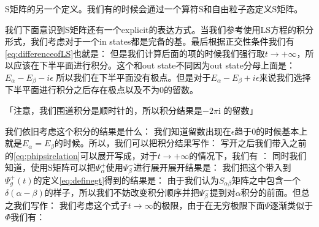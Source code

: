  S矩阵的另一个定义。我们有的时候会通过一个算符S和自由粒子态定义S矩阵。

我们下面意识到S矩阵还有一个explicit的表达方式。当我们参考使用LS方程的积分形式，我们考虑对于一个in states都是完备的基。最后根据正交性条件我们有\cref{eq:differenceofLS}也就是：
但是我们计算后面的项的时候我们强行取$ t \to +\infty $，所以应该在下半平面进行积分。这个和out state不同因为out state分母上面是：$ E_\alpha-E_\beta- i\epsilon $ 所以我们在下半平面没有极点。但是对于$ E_\alpha-E_\beta+ i\epsilon $来说我们选择下半平面进行积分之后存在极点以及不为0的留数。

「注意，我们围道积分是顺时针的，所以积分结果是$ -2 \pi \mathrm{i} $ 的留数」

我们依旧考虑这个积分的结果是什么：
我们知道留数出现在$ \epsilon $趋于0的时候基本上就是$ E_\alpha = E_\beta $的时候。所以，我们可以把积分结果写作：
写开之后我们带入之前的\cref{eq:phipsirelation}可以展开写成，对于$ t \to +\infty $的情况下，我们有 ：
\line
同时我们知道，使用S矩阵可以把$ \Psi_\alpha^{+} $使用$ \Psi_\beta^{-} $进行展开展开结果是：
我们把这个带入到$ \Psi_g^+(t) $的定义\cref{eq:definegt}得到的结果是：
由于我们认为$ S_{\alpha\beta} $矩阵之中包含一个$ \delta(\alpha - \beta) $的样子，所以我们不妨改变积分顺序并把$ \Psi_\beta^- $提到对$ \alpha $积分的前面。但总之我们写作：
我们考虑这个式子$ t \to \infty $的极限，由于在无穷极限下面$ \Psi $逐渐类似于$ \Phi $我们有：

